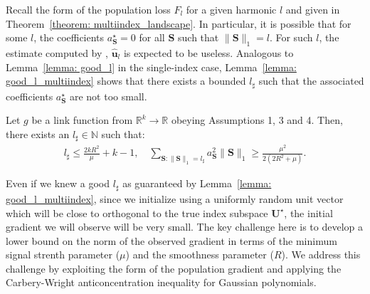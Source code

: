\documentclass[final,12pt]{colt2018} %
\newcommand{\N}{\mathbb{N}}
\newcommand{\R}{\mathbb{R}}
\renewcommand\v[1]{{\ensuremath{\boldsymbol{#1}}}}
\newcommand\ip[1]{\left\langle #1 \right\rangle}
\begin{document}

Recall the form of the population loss $F_l$ for a given harmonic $l$ and given in Theorem~\ref{theorem: multiindex_landscape}.
In particular, it is possible that for some $l$, the coefficients $a_{\v S}^\star = 0$ for all ${\v S}$ such that $\|{\v S}\|_1 = l$. For such $l$, the estimate computed by , $\hat{\v u}_l$ is expected to be useless. Analogous to Lemma~\ref{lemma: good_l} in the single-index case, Lemma~\ref{lemma: good_l_multiindex} shows that there exists a bounded $l_\sharp$ such that the associated coefficients $a_{\v S}^\star$ are not too small.  

\begin{lemma}Let $g$ be a link function from $\R^k \rightarrow \R$ obeying Assumptions 1, 3 and 4. Then, there exists an $l_\sharp \in \N$ such that:
\begin{align*}
    l_\sharp \leq \frac{2kR^2}{\mu} + k - 1, \quad \sum_{{\v S}: \|{\v S}\|_1 = l_\sharp} a_{\v S}^2 \|{\v S}\|_1 \geq \frac{\mu^2}{2(2R^2 + \mu)}.
\end{align*}
\label{lemma: good_l_multiindex}
\end{lemma}

Even if we knew a good $l_\sharp$ as guaranteed by Lemma~\ref{lemma: good_l_multiindex}, since we initialize using a uniformly random unit vector which will be close to orthogonal to the true index subspace $\mathcal{\v U}^\star$, the initial gradient we will observe will be very small. The key challenge here is to develop a lower bound on the norm of the observed gradient in terms of the minimum signal strenth parameter ($\mu$) and the smoothness parameter ($R$). We address this challenge by exploiting the form of the population gradient and applying the Carbery-Wright anticoncentration inequality for Gaussian polynomials.
\end{document}
